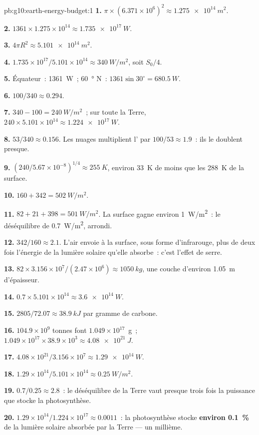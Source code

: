 \begin{solution}{pb:g10:earth-energy-budget:1}
\textbf{1.} $\pi \times (6.371\times10^6)^2 \approx \qty{1.275e14}{m^2}$.

\textbf{2.} $1361 \times 1.275\times10^{14} \approx \qty{1.735e17}{W}$.

\textbf{3.} $4\pi R^2 \approx \qty{5.101e14}{m^2}$.

\textbf{4.} $1.735\times10^{17}/5.101\times10^{14} \approx \qty{340}{W/m^2}$,
soit $S_0/4$.

\textbf{5.} Équateur~: \qty{1361}{W}~; \qty{60}{\degree} N~: $1361 \sin
30^\circ = \qty{680.5}{W}$.

\textbf{6.} $100/340 \approx 0.294$.

\textbf{7.} $340 - 100 = \qty{240}{W/m^2}$~; sur toute la Terre, $240 \times
5.101\times10^{14} \approx \qty{1.224e17}{W}$.

\textbf{8.} $53/340 \approx 0.156$. Les nuages multiplient l' par
$100/53 \approx 1.9$~: ils le doublent presque.

\textbf{9.} $(240/5.67\times10^{-8})^{1/4} \approx \qty{255}{K}$, environ
\qty{33}{K} de moins que les \qty{288}{K} de la surface.

\textbf{10.} $160 + 342 = \qty{502}{W/m^2}$.

\textbf{11.} $82 + 21 + 398 = \qty{501}{W/m^2}$. La surface gagne environ
\qty{1}{W/m^2}~: le déséquilibre de \qty{0.7}{W/m^2}, arrondi.

\textbf{12.} $342/160 \approx 2.1$. L'air envoie à la surface, sous forme
d'infrarouge, plus de deux fois l'énergie de la lumière solaire qu'elle
absorbe~: c'est l'effet de serre.

\textbf{13.} $82 \times 3.156\times10^7/(2.47\times10^6) \approx
\qty{1050}{kg}$, une couche d'environ \qty{1.05}{m} d'épaisseur.

\textbf{14.} $0.7 \times 5.101\times10^{14} \approx \qty{3.6e14}{W}$.

\textbf{15.} $2805/72.07 \approx \qty{38.9}{kJ}$ par gramme de carbone.

\textbf{16.} $104.9\times10^9$ tonnes font $1.049\times10^{17}$~g~;
$1.049\times10^{17} \times 38.9\times10^3 \approx \qty{4.08e21}{J}$.

\textbf{17.} $4.08\times10^{21}/3.156\times10^7 \approx \qty{1.29e14}{W}$.

\textbf{18.} $1.29\times10^{14}/5.101\times10^{14} \approx
\qty{0.25}{W/m^2}$.

\textbf{19.} $0.7/0.25 \approx 2.8$~: le déséquilibre de la Terre vaut
presque trois fois la puissance que stocke la photosynthèse.

\textbf{20.} $1.29\times10^{14}/1.224\times10^{17} \approx 0.0011$~: la
photosynthèse stocke \textbf{environ \qty{0.1}{\percent}} de la lumière
solaire absorbée par la Terre --- un millième.
\end{solution}
